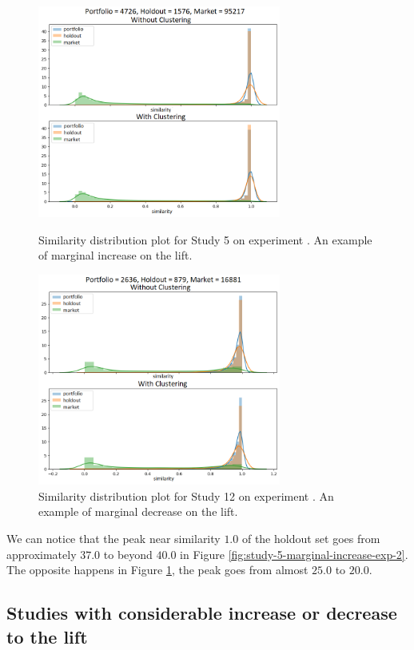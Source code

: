 \begin{figure}[!ht]
   \centering
   \includegraphics[width=8cm]{fig/ch4-study-5-marginal-increase-exp-2.png}
   \caption{Similarity distribution plot for Study 5 on experiment \nameExperimentII{}. An example of marginal increase on the lift.}
   \label{fig:study-5-marginal-increase-exp-2}

   \includegraphics[width=8cm]{fig/ch4-study-12-marginal-decrease-exp-1.png}
   \caption{Similarity distribution plot for Study 12 on experiment \nameExperimentI{}. An example of marginal decrease on the lift.}
   \label{fig:study-12-marginal-decrease-exp-1}
\end{figure}

We can notice that the peak near similarity $1.0$ of the holdout set goes from approximately $37.0$ to beyond $40.0$ in Figure \ref{fig:study-5-marginal-increase-exp-2}. The opposite happens in Figure \ref{fig:study-12-marginal-decrease-exp-1}, the peak goes from almost $25.0$ to $20.0$.

\subsection{Studies with considerable increase or decrease to the lift}
\label{ch:considerable-change}

